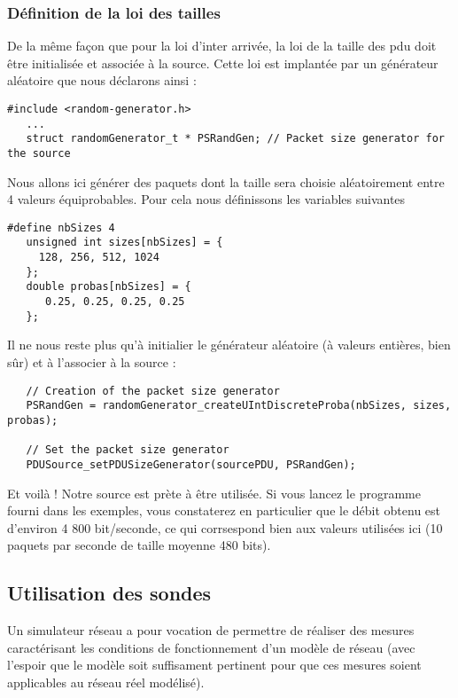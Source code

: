 \subsubsection{Définition de la loi des tailles}

   De la même façon que pour la loi d'inter arrivée, la loi de la
taille des {\sc pdu} doit être initialisée et associée à la source.
Cette loi est implantée par un générateur aléatoire que nous déclarons
ainsi :

\begin{verbatim}
#include <random-generator.h>
   ...
   struct randomGenerator_t * PSRandGen; // Packet size generator for the source
\end{verbatim}

   Nous allons ici générer des paquets dont la taille sera choisie
aléatoirement entre 4 valeurs équiprobables. Pour cela nous
définissons  les variables suivantes

\begin{verbatim}
#define nbSizes 4
   unsigned int sizes[nbSizes] = {
     128, 256, 512, 1024
   };
   double probas[nbSizes] = {
      0.25, 0.25, 0.25, 0.25
   };
\end{verbatim}

   Il ne nous reste plus qu'à initialier le générateur aléatoire (à
valeurs entières, bien sûr) et à l'associer à la source :

\begin{verbatim}
   // Creation of the packet size generator
   PSRandGen = randomGenerator_createUIntDiscreteProba(nbSizes, sizes, probas);

   // Set the packet size generator
   PDUSource_setPDUSizeGenerator(sourcePDU, PSRandGen);
\end{verbatim}

   Et voilà ! Notre source est prète à être utilisée. Si vous lancez
le programme fourni dans les exemples, vous constaterez en particulier
que le débit obtenu est d'environ 4 800 bit/seconde, ce qui
corrsespond bien aux valeurs utilisées ici (10 paquets par seconde de
taille moyenne 480 bits).

%
\subsection{Utilisation des sondes}

   Un simulateur réseau a pour vocation de permettre de réaliser des
mesures caractérisant les conditions de fonctionnement d'un modèle de
réseau (avec l'espoir que le modèle soit suffisament pertinent pour
que ces mesures soient applicables au réseau réel modélisé).

